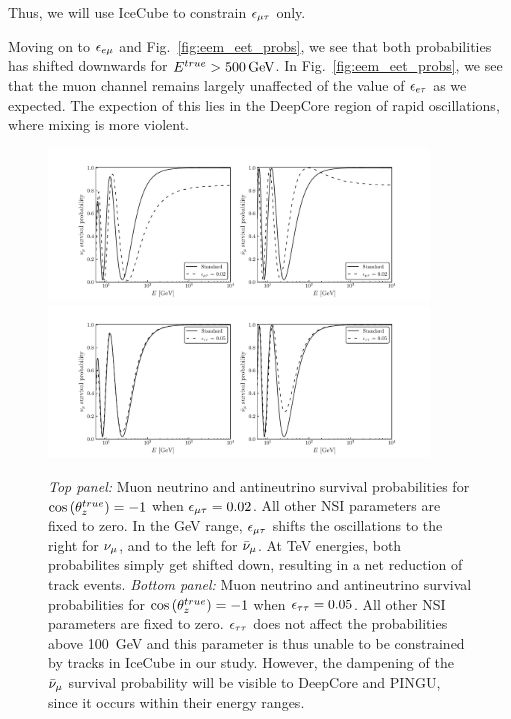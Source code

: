 Thus, we will use IceCube to constrain $\epsilon_{\mu\tau}$ only.


Moving on to $\epsilon_{e\mu}$ and Fig.~\ref{fig:eem_eet_probs}, we see that both probabilities has shifted downwards for $\Etrue > \SI{500}{\GeV}$.
In Fig.~\ref{fig:eem_eet_probs}, we see that the muon channel remains largely unaffected of the value of $\epsilon_{e\tau}$ as we expected. The expection of this lies 
in the DeepCore region of rapid oscillations, where mixing is more violent. 
\begin{figure}
    \begin{center}%
        \includegraphics[width=0.9\textwidth]{figures/emt_probs.pdf}
        \includegraphics[width=0.9\textwidth]{figures/ett_probs.pdf}
        \caption{\emph{Top panel:} Muon neutrino and antineutrino survival probabilities for
        $\cos{(\theta_z^{true})} = -1$ when $\epsilon_{\mu\tau} = 0.02$. All other NSI parameters are fixed to zero. In the \si{\GeV} range, $\epsilon_{\mu\tau}$ shifts the oscillations to the right for $\nu_\mu$, and to the left for $\bar{\nu}_\mu$. At \si{\TeV} energies, both probabilites simply get shifted down, resulting in a net reduction of track events.
        \emph{Bottom panel:} Muon neutrino and antineutrino survival probabilities for
        $\cos{(\theta_z^{true})} = -1$ when $\epsilon_{\tau\tau} = 0.05$. All other NSI parameters are fixed to zero. $\epsilon_{\tau\tau}$ does not affect the probabilities above \SI{100}{\GeV} and this parameter is thus unable to be constrained by tracks in IceCube in our study. However, the dampening of the $\bar{\nu}_\mu$ survival probability will be visible to DeepCore and PINGU, since it occurs within their energy ranges.}
        \label{fig:emt_ett_probs}
    \end{center}
\end{figure}


